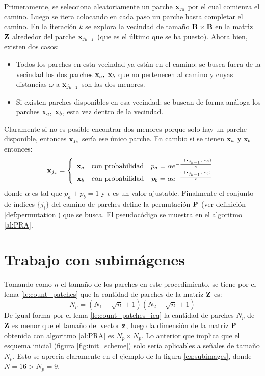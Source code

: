 Primeramente, se selecciona aleatoriamente un parche $\x_{j_0}$ por el cual comienza el camino. Luego se itera colocando en cada paso un parche hasta completar el camino. En la iteraci\'on $k$ se explora la vecindad de tamaño $\B \times \B$ en la matriz $\Z$ alrededor del parche $\x_{j_{k - 1}}$ (que es el \'ultimo que se ha puesto). Ahora bien, existen dos casos:
\begin{itemize}
\item Todos los parches en esta vecindad ya están en el camino: se busca fuera de la vecindad los dos parches $\x_a,\; \x_b$ que no pertenecen al camino y cuyas distancias $\omega$ a $\x_{j_{k - 1}}$ son las dos menores.
\item Si existen parches disponibles en esa vecindad: se buscan de forma an\'aloga los parches $\x_a,\; \x_b$, esta vez dentro de la vecindad.
\end{itemize}
Claramente si no es posible encontrar dos menores porque solo hay un parche disponible, entonces $\x_{j_k}$ ser\'ia ese \'unico parche. En cambio si se tienen $\x_a$ y $\x_b$ entonces:
\begin{equation}
	\x_{j_k} = \left\{
		\begin{array}{ccc}
		\x_a &\mbox{con probabilidad}& p_a = \alpha e^{-\frac{\omega(\x_{j_{k - 1}},\; \x_a)}{\epsilon}}\\
		\x_b &\mbox{con probabilidad}& p_b = \alpha e^{-\frac{\omega(\x_{j_{k - 1}},\; \x_b)}{\epsilon}}\\
		\end{array}
	\right.
	\label{eq:choosing_patch}
\end{equation}
donde $\alpha$ es tal que $p_a + p_b = 1$ y $\epsilon$ es un valor ajustable. Finalmente el conjunto de \'indices $\{j_i\}$ del camino de parches define la permutaci\'on $\P$ (ver definici\'on \ref{def:permutation}) que se busca. El pseudoc\'odigo se muestra en el algoritmo \ref{al:PRA}.

\section{Trabajo con subim\'agenes}
Tomando como $n$ el tamaño de los parches en este procedimiento, se tiene por el lema \ref{le:count_patches} que la cantidad de parches de la matriz $\Z$ es: 
\begin{equation}
	N_p = (N_1 - \sqrt{n} + 1)(N_2 - \sqrt{n} + 1)
	\label{eq:patches}
\end{equation}
De igual forma por el lema \ref{le:count_patches_ieq} la cantidad de parches $N_p$ de $\Z$ es menor que el tamaño del vector $\z$, luego la dimensi\'on de la matriz $\P$ obtenida con algoritmo \ref{al:PRA} es $N_p \times N_p$. Lo anterior que implica que el esquema inicial (figura \ref{fig:init_scheme}) solo ser\'ia aplicables a señales de tamaño $N_p$. Esto se aprecia claramente en el ejemplo de la figura \ref{ex:subimages}, donde $N = 16 > N_p = 9$.

